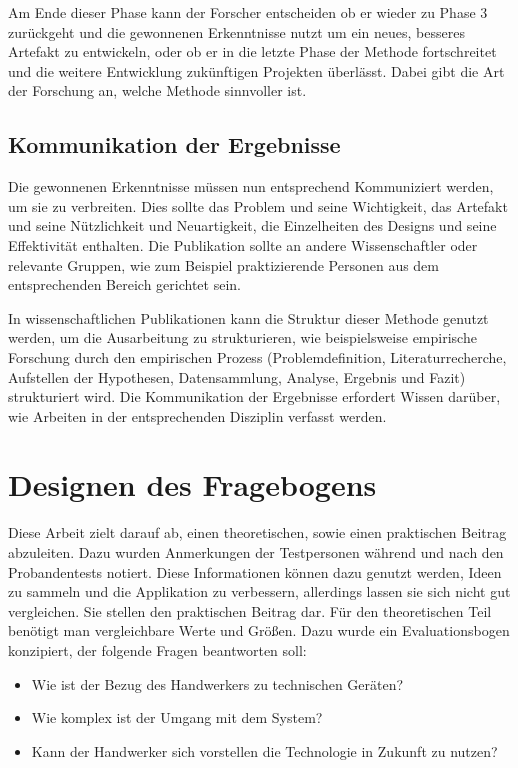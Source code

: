Am Ende dieser Phase kann der Forscher entscheiden ob er wieder zu Phase 3 zurückgeht und die gewonnenen Erkenntnisse nutzt um ein neues, besseres Artefakt zu entwickeln, oder ob er in die letzte Phase der Methode fortschreitet und die weitere Entwicklung zukünftigen Projekten überlässt. Dabei gibt die Art der Forschung an, welche Methode sinnvoller ist.

\subsection{Kommunikation der Ergebnisse}

Die gewonnenen Erkenntnisse müssen nun entsprechend Kommuniziert werden, um sie zu verbreiten. Dies sollte das Problem und seine Wichtigkeit, das Artefakt und seine Nützlichkeit und Neuartigkeit, die Einzelheiten des Designs und seine Effektivität enthalten. Die Publikation sollte an andere Wissenschaftler oder relevante Gruppen, wie zum Beispiel praktizierende Personen aus dem entsprechenden Bereich gerichtet sein. 

In wissenschaftlichen Publikationen kann die Struktur dieser Methode genutzt werden, um die Ausarbeitung zu strukturieren, wie beispielsweise empirische Forschung durch den empirischen Prozess (Problemdefinition, Literaturrecherche, Aufstellen der Hypothesen, Datensammlung, Analyse, Ergebnis und Fazit) strukturiert wird. Die Kommunikation der Ergebnisse erfordert Wissen darüber, wie Arbeiten in der entsprechenden Disziplin verfasst werden. 

\section{Designen des Fragebogens}

Diese Arbeit zielt darauf ab, einen theoretischen, sowie einen praktischen Beitrag abzuleiten. Dazu wurden Anmerkungen der Testpersonen während und nach den Probandentests notiert. Diese Informationen können dazu genutzt werden, Ideen zu sammeln und die Applikation zu verbessern, allerdings lassen sie sich nicht gut vergleichen. Sie stellen den praktischen Beitrag dar. Für den theoretischen Teil benötigt man vergleichbare Werte und Größen. Dazu wurde ein Evaluationsbogen konzipiert, der folgende Fragen beantworten soll:

\begin{itemize}
	\item Wie ist der Bezug des Handwerkers zu technischen Geräten?
	\item Wie komplex ist der Umgang mit dem System?
	\item Kann der Handwerker sich vorstellen die Technologie in Zukunft zu nutzen?
\end{itemize}

